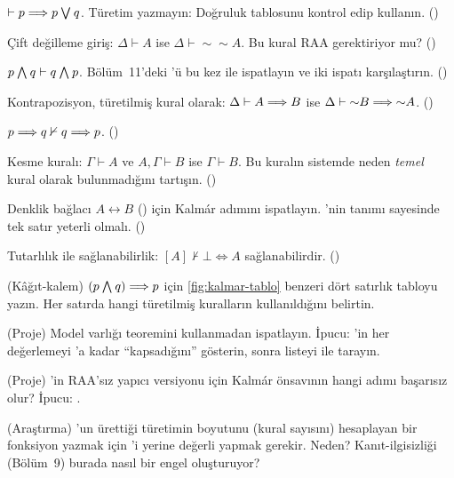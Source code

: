 \begin{alistirmalar}
 $\vdash p \Longrightarrow p \mathbin{\textstyle\bigvee} q$. Türetim yazmayın: Doğruluk
tablosunu kontrol edip  kullanın. ()

 Çift değilleme giriş: $\Delta \vdash A$ ise $\Delta \vdash
{\sim}{\sim}A$. Bu kural RAA gerektiriyor mu? ()

 $p \mathbin{\textstyle\bigwedge} q \vdash q \mathbin{\textstyle\bigwedge} p$. Bölüm~11'deki 'ü
bu kez  ile ispatlayın ve iki ispatı karşılaştırın.
()

 Kontrapozisyon, türetilmiş kural olarak: $\Delta \vdash A
\Longrightarrow B$ ise $\Delta \vdash {\sim}B \Longrightarrow {\sim}A$. ()

 $p \Longrightarrow q \nvdash q \Longrightarrow p$. ()

 Kesme kuralı: $\Gamma \vdash A$ ve $A, \Gamma \vdash B$ ise
$\Gamma \vdash B$. Bu kuralın sistemde neden \emph{temel} kural olarak
bulunmadığını tartışın. ()

 Denklik bağlacı $A \leftrightarrow B$ () için
Kalmár adımını ispatlayın. 'nin tanımı sayesinde tek satır
yeterli olmalı. ()

 Tutarlılık ile sağlanabilirlik: $[A] \nvdash \bot \iff A$
sağlanabilirdir. ()

 (Kâğıt-kalem) $(p \mathbin{\textstyle\bigwedge} q) \Longrightarrow p$ için
\cref{fig:kalmar-tablo} benzeri dört satırlık tabloyu yazın. Her satırda
hangi türetilmiş kuralların kullanıldığını belirtin.

 (Proje) Model varlığı teoremini  kullanmadan
ispatlayın. İpucu: 'in her değerlemeyi
'a kadar ``kapsadığını'' gösterin, sonra listeyi
 ile tarayın.

 (Proje) 'in RAA'sız yapıcı versiyonu
 için Kalmár önsavının hangi adımı başarısız olur? İpucu:
.

 (Araştırma) 'un ürettiği türetimin
boyutunu (kural sayısını) hesaplayan bir fonksiyon yazmak için
'i  yerine  değerli yapmak gerekir.
Neden? Kanıt-ilgisizliği (Bölüm~9) burada nasıl bir engel oluşturuyor?
\end{alistirmalar}
